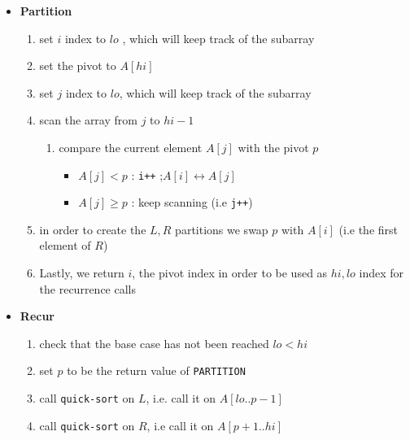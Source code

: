 \begin{itemize}
		\item\textbf{Partition}
				\begin{enumerate}
						\item set $i$ index to $lo$ , which will keep track of
								the  subarray
						\item set the pivot to $A[hi]$
						\item set $j$ index to $lo$, which will keep track of
								the  subarray
						\item scan the array from $j$ to $hi-1$
						\begin{enumerate}
								\item compare the current element $A[j]$ with
										the pivot $p$
										\begin{itemize}
												\item $A[j] < p$ : \texttt{i++}
														;$ A[i]
														\leftrightarrow A[j]$ 
												\item $A[j] \geq p$ : keep
														scanning (i.e
														\texttt{j++}) 
										\end{itemize}
						\end{enumerate}
						\item in order to create the $L, R$ partitions
								we swap $p$ with $A[i]$ (i.e the first
								element of $R$)
						\item Lastly, we return $i$, the pivot index in order to
								be used as $hi, lo$ index for the recurrence
								calls
				\end{enumerate}
		\item\textbf{Recur}
					\begin{enumerate}
							\item check that the base case has not been reached
									$lo < hi$
							\item set $p$ to be the return value of
									\texttt{PARTITION}
							\item call \texttt{quick-sort} on $L$, i.e. call it on
									$A[lo..p-1]$
							\item call \texttt{quick-sort} on $R$, i.e call it on
									$A[p+1..hi]$
					\end{enumerate}

	\end{itemize}

								
